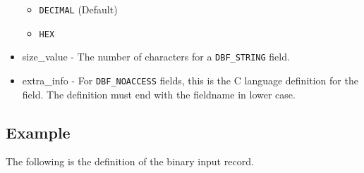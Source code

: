 \begin{itemize}
\begin{itemize}
\item \verb|DECIMAL| (Default)
\item \verb|HEX|
\end{itemize}

\item {}size\_value - The number of characters for a \verb|DBF_STRING| field.

\item {}extra\_info - For \verb|DBF_NOACCESS| fields, this is the C language definition for the field. The definition must end 
with the fieldname in lower case.

\end{itemize}

\subsection{Example}

The following is the definition of the binary input record.

